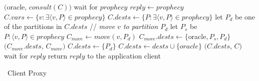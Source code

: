 \begin{algorithm}[h!]
\small

\begin{distribalgo}[1]

\vspace{1.0mm}


\vspace{1.0mm}

        \STATE \amcast$($oracle, $consult(C))$
        \STATE wait for $prophecy$
            \STATE $reply \leftarrow prophecy$
        \ELSE
            \STATE $C.vars \leftarrow \{v: \exists \langle v, P \rangle \in prophecy \}$
            \STATE $C.dests \leftarrow \{P : \exists \langle v, P \rangle \in prophecy \}$
                \STATE let $P_d$ be one of the partitions in $C.dests$
                    \STATE // \textit{move $v$ to partition $P_d$}
                    \STATE let $P_s$ be $P : \langle v, P \rangle \in prophecy$
                        \STATE $C_{move} \leftarrow move(v,P_d)$
                        \STATE $C_{move}.dests \leftarrow \{$oracle$,P_s,P_d\}$    
                        \STATE \amcast$(C_{move}.dests$, $C_{move})$
                    \ENDIF
                \ENDFOR
                \STATE $C.dests \leftarrow \{ P_d \}$
            \ENDIF
                \STATE $C.dests \leftarrow dests \cup \{oracle\}$
            \ENDIF
            \STATE \amcast$(C.dests$, $C)$
            \STATE wait for $reply$
        \ENDIF
    \ENDINDENT
    \STATE return $reply$ to the application client
\ENDINDENT

\caption{\dssmr\ Client Proxy}
\label{alg:client_proxy}
\end{distribalgo}
\end{algorithm}